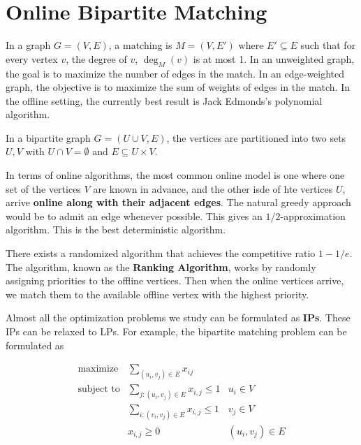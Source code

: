 



\section{Online Bipartite Matching}

In a graph $G = (V,E)$, a matching is $M=(V,E')$ where $E' \subseteq E$ such that for every vertex $v$, the degree of $v$, $\deg_M(v)$ is at most 1. In an unweighted graph, the goal is to maximize the number of edges in the match. In an edge-weighted graph, the objective is to maximize the sum of weights of edges in the match. In the offline setting, the currently best result is Jack Edmonds's polynomial algorithm.

In a bipartite graph $G = (U \cup V,E)$, the vertices are partitioned into two sets $U,V$ with $U \cap V = \emptyset$ and $E \subseteq U \times V$.

In terms of online algorithms, the most common online model is one where one set of the vertices $V$ are known in advance, and the other isde of hte vertices $U$, arrive \textbf{online along with their adjacent edges}. The natural greedy approach would be to admit an edge whenever possible. This gives an $1/2$-approximation algorithm. This is the best deterministic algorithm.

There exists a randomized algorithm that achieves the competitive ratio $1-1/e$. The algorithm, known as the \textbf{Ranking Algorithm}, works by randomly assigning priorities to the offline vertices. Then when the online vertices arrive, we match them to the available offline vertex with the highest priority. 

Almost all the optimization problems we study can be formulated as \textbf{IPs}. These IPs can be relaxed to LPs. For example, the bipartite matching problem can be formulated as

$$
\begin{array}{lll}
    \text{maximize} & \displaystyle{\sum_{(u_i,v_j) \in E}} x_{ij} \\
    \text{subject to} & \displaystyle{\sum_{j:(u_i,v_j) \in E}} x_{i,j} \leq 1 & u_i \in V \\
    & \displaystyle{\sum_{i:(v_i,v_j) \in E}} x_{i,j} \leq 1 & v_j \in V \\
    & x_{i,j} \geq 0 & (u_i,v_j) \in E
\end{array}
$$

